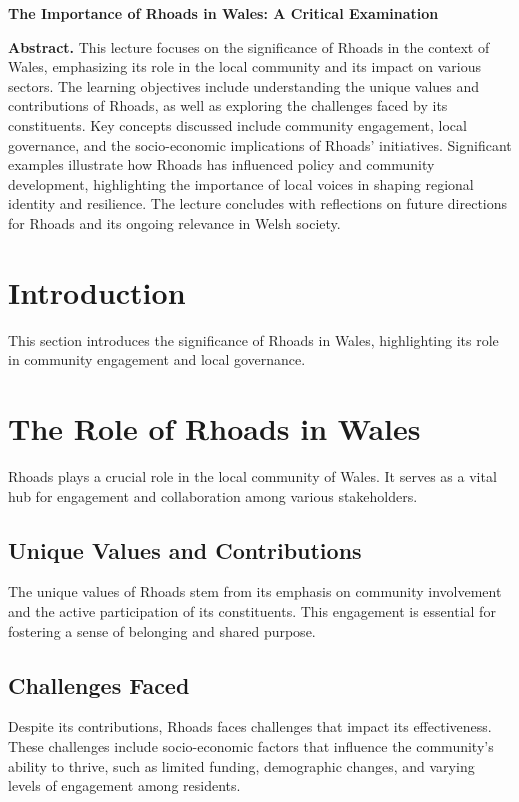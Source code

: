 \documentclass[a4paper]{article}
\begin{document}
\begin{center}
{\LARGE \textbf{The Importance of Rhoads in Wales: A Critical Examination}}\\[1em]
\end{center}

\textbf{Abstract.} This lecture focuses on the significance of Rhoads in the context of Wales, emphasizing its role in the local community and its impact on various sectors. The learning objectives include understanding the unique values and contributions of Rhoads, as well as exploring the challenges faced by its constituents. Key concepts discussed include community engagement, local governance, and the socio-economic implications of Rhoads' initiatives. Significant examples illustrate how Rhoads has influenced policy and community development, highlighting the importance of local voices in shaping regional identity and resilience. The lecture concludes with reflections on future directions for Rhoads and its ongoing relevance in Welsh society.

\section{Introduction}
This section introduces the significance of Rhoads in Wales, highlighting its role in community engagement and local governance.

\section{The Role of Rhoads in Wales}
Rhoads plays a crucial role in the local community of Wales. It serves as a vital hub for engagement and collaboration among various stakeholders.

\subsection{Unique Values and Contributions}
The unique values of Rhoads stem from its emphasis on community involvement and the active participation of its constituents. This engagement is essential for fostering a sense of belonging and shared purpose.

\subsection{Challenges Faced}
Despite its contributions, Rhoads faces challenges that impact its effectiveness. These challenges include socio-economic factors that influence the community's ability to thrive, such as limited funding, demographic changes, and varying levels of engagement among residents.
\end{document}
